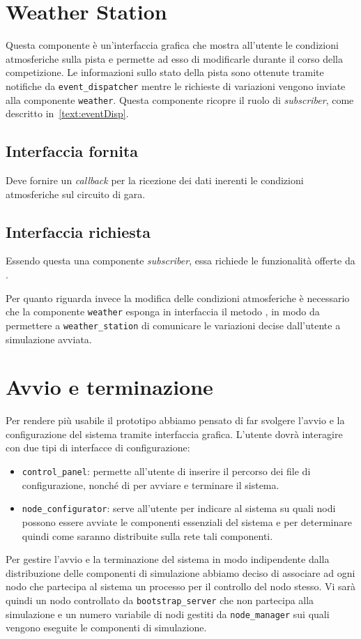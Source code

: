 \section{Weather Station}
Questa componente è un'interfaccia grafica che mostra all'utente le condizioni atmosferiche sulla pista e permette ad esso di modificarle durante il corso della competizione. Le informazioni sullo stato della pista sono ottenute tramite notifiche da \texttt{event\_dispatcher} mentre le richieste di variazioni vengono inviate alla componente \texttt{weather}.
Questa componente ricopre il ruolo di \textit{subscriber}, come descritto in~\ref{text:eventDisp}.

\subsection*{Interfaccia fornita}
Deve fornire un \textit{callback} per la ricezione dei dati inerenti le condizioni atmosferiche sul circuito di gara.
\subsection*{Interfaccia richiesta}
Essendo questa una componente \textit{subscriber}, essa richiede le funzionalità offerte da .

Per quanto riguarda invece la modifica delle condizioni atmosferiche è necessario che la componente \texttt{weather} esponga in interfaccia il metodo , in modo da permettere a \texttt{weather\_station} di comunicare le variazioni decise dall'utente a simulazione avviata.

\section{Avvio e terminazione}
\label{sec:start-stop}
Per rendere più usabile il prototipo abbiamo pensato di far svolgere l'avvio e la configurazione del sistema tramite interfaccia grafica.
L'utente dovrà interagire con due tipi di interfacce di configurazione:
\begin{itemize}
\item \texttt{control\_panel}: permette all'utente di inserire il percorso dei file di configurazione, nonché di per avviare e terminare il sistema.
\item \texttt{node\_configurator}: serve all'utente per indicare al sistema su quali nodi possono essere avviate le componenti essenziali del sistema e per determinare quindi come saranno distribuite sulla rete tali componenti.
\end{itemize}
Per gestire l'avvio e la terminazione del sistema in modo indipendente dalla distribuzione delle componenti di simulazione abbiamo deciso di associare ad ogni nodo che partecipa al sistema un processo per il controllo del nodo stesso. Vi sarà quindi un nodo controllato da \texttt{bootstrap\_server} che non partecipa alla simulazione e un numero variabile di nodi gestiti da \texttt{node\_manager} sui quali vengono eseguite le componenti di simulazione.


